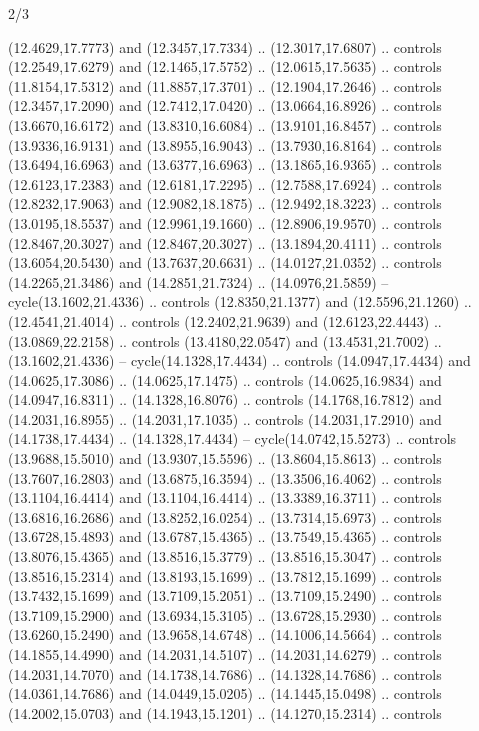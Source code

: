 \begin{flagdescription}{2/3}
\begin{scope}[yshift=\flagwidth,scale=\flagwidth/1241.93737]
\begin{scope}[y=-1mm, x=1mm,draw=gold,fill=blue,line join=miter,miter limit=4,line width=1.8\lw]
{  (12.4629,17.7773) and (12.3457,17.7334) .. (12.3017,17.6807) .. controls
  (12.2549,17.6279) and (12.1465,17.5752) .. (12.0615,17.5635) .. controls
  (11.8154,17.5312) and (11.8857,17.3701) .. (12.1904,17.2646) .. controls
  (12.3457,17.2090) and (12.7412,17.0420) .. (13.0664,16.8926) .. controls
  (13.6670,16.6172) and (13.8310,16.6084) .. (13.9101,16.8457) .. controls
  (13.9336,16.9131) and (13.8955,16.9043) .. (13.7930,16.8164) .. controls
  (13.6494,16.6963) and (13.6377,16.6963) .. (13.1865,16.9365) .. controls
  (12.6123,17.2383) and (12.6181,17.2295) .. (12.7588,17.6924) .. controls
  (12.8232,17.9063) and (12.9082,18.1875) .. (12.9492,18.3223) .. controls
  (13.0195,18.5537) and (12.9961,19.1660) .. (12.8906,19.9570) .. controls
  (12.8467,20.3027) and (12.8467,20.3027) .. (13.1894,20.4111) .. controls
  (13.6054,20.5430) and (13.7637,20.6631) .. (14.0127,21.0352) .. controls
  (14.2265,21.3486) and (14.2851,21.7324) .. (14.0976,21.5859) --
  cycle(13.1602,21.4336) .. controls (12.8350,21.1377) and (12.5596,21.1260) ..
  (12.4541,21.4014) .. controls (12.2402,21.9639) and (12.6123,22.4443) ..
  (13.0869,22.2158) .. controls (13.4180,22.0547) and (13.4531,21.7002) ..
  (13.1602,21.4336) -- cycle(14.1328,17.4434) .. controls (14.0947,17.4434) and
  (14.0625,17.3086) .. (14.0625,17.1475) .. controls (14.0625,16.9834) and
  (14.0947,16.8311) .. (14.1328,16.8076) .. controls (14.1768,16.7812) and
  (14.2031,16.8955) .. (14.2031,17.1035) .. controls (14.2031,17.2910) and
  (14.1738,17.4434) .. (14.1328,17.4434) -- cycle(14.0742,15.5273) .. controls
  (13.9688,15.5010) and (13.9307,15.5596) .. (13.8604,15.8613) .. controls
  (13.7607,16.2803) and (13.6875,16.3594) .. (13.3506,16.4062) .. controls
  (13.1104,16.4414) and (13.1104,16.4414) .. (13.3389,16.3711) .. controls
  (13.6816,16.2686) and (13.8252,16.0254) .. (13.7314,15.6973) .. controls
  (13.6728,15.4893) and (13.6787,15.4365) .. (13.7549,15.4365) .. controls
  (13.8076,15.4365) and (13.8516,15.3779) .. (13.8516,15.3047) .. controls
  (13.8516,15.2314) and (13.8193,15.1699) .. (13.7812,15.1699) .. controls
  (13.7432,15.1699) and (13.7109,15.2051) .. (13.7109,15.2490) .. controls
  (13.7109,15.2900) and (13.6934,15.3105) .. (13.6728,15.2930) .. controls
  (13.6260,15.2490) and (13.9658,14.6748) .. (14.1006,14.5664) .. controls
  (14.1855,14.4990) and (14.2031,14.5107) .. (14.2031,14.6279) .. controls
  (14.2031,14.7070) and (14.1738,14.7686) .. (14.1328,14.7686) .. controls
  (14.0361,14.7686) and (14.0449,15.0205) .. (14.1445,15.0498) .. controls
  (14.2002,15.0703) and (14.1943,15.1201) .. (14.1270,15.2314) .. controls
}
\end{scope}
\end{scope}
\end{flagdescription}
